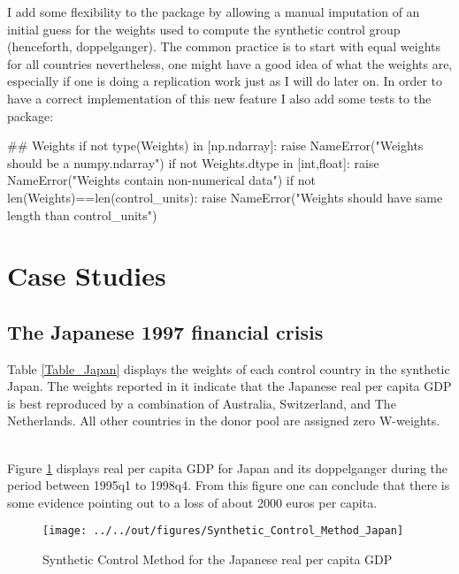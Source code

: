 \documentclass[11pt, a4paper, leqno]{article}
\begin{document}
I add some flexibility to the package by allowing a manual imputation of an initial guess for the weights used to compute the synthetic control group (henceforth, doppelganger). The common practice is to start with equal weights for all countries nevertheless, one might have a good idea of what the weights are, especially if one is doing a replication work just as I will do later on. In order to have a correct implementation of this new feature I also add some tests to the package: \\
\begin{python}
## Weights
if not type(Weights) in [np.ndarray]:
    raise NameError("Weights should be a numpy.ndarray")
if not Weights.dtype in [int,float]:
    raise NameError("Weights contain non-numerical data")
if not len(Weights)==len(control_units):
    raise NameError("Weights should have same length than control_units")
\end{python}


\clearpage

\section{Case Studies}

\subsection{The Japanese 1997 financial crisis}
\label{Japan}

Table \ref{Table_Japan} displays the weights of each control country in the synthetic Japan. The weights reported in it indicate that the Japanese real per capita GDP is best reproduced by a combination of Australia, Switzerland, and The Netherlands. All other countries in the donor pool are assigned zero W-weights.\\

 \label{Table_Japan} \\

\clearpage

Figure \ref{JPN} displays real per capita GDP for Japan and its doppelganger during the period between 1995q1 to 1998q4. From this figure one can conclude that there is some evidence pointing out to a loss of about 2000 euros per capita. \\

\begin{figure}[!htbp]
    \caption{Synthetic Control Method for the Japanese real per capita GDP}
    \texttt{[image: ../../out/figures/Synthetic\_Control\_Method\_Japan]}
    \label{JPN}
\end{figure}
\end{document}
